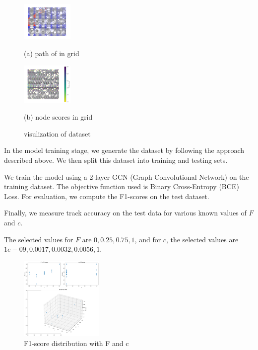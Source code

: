 \documentclass{article}
\begin{document}
\begin{figure}[htb]
  \begin{minipage}[b]{.48\linewidth}
    \centering
    \centerline{\includegraphics[width=2.5cm]{images/path}}
    \centerline{(a) path of in grid}\medskip
  \end{minipage}
  \hfill
  \begin{minipage}[b]{0.48\linewidth}
    \centering
    \centerline{\includegraphics[width=2.5cm]{images/scores}}
    \centerline{(b) node scores in grid }\medskip
  \end{minipage}
  \caption{visulization of dataset}
  \label{fig:data}
  \end{figure}

  In the model training stage, we generate the dataset by following the approach described above. We then split this dataset into training and testing sets.

  We train the model using a 2-layer GCN (Graph Convolutional Network) on the training dataset. The objective function used is Binary Cross-Entropy (BCE) Loss.
  For evaluation, we compute the F1-scores on the test dataset.

  Finally, we measure track accuracy on the test data for various known values of $F$ and $c$.

  The selected values for $F$ are $0, 0.25, 0.75, 1$, and for $c$, the selected values are $1e-09, 0.0017, 0.0032, 0.0056, 1$.
  
  \begin{figure}[htb]

    \begin{minipage}[b]{1.0\linewidth}
      \centering
      \centerline{\includegraphics[width=4.0cm]{images/F_c_f1}}
    \end{minipage}
    \caption{F1-score distribution with F and c}
    \label{fig:f1}
    \end{figure}
\end{document}
